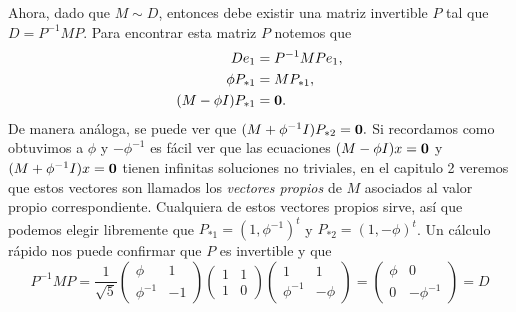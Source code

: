 Ahora, dado que $M \sim D$, entonces debe existir una matriz invertible $P$ tal que $D = P^{-1} M P$. Para encontrar esta matriz $P$ notemos que
\begin{align*}
  De_1 &=  P^{-1} M Pe_1, \\
  \phi P_{*1} &= M P_{*1}, \\
  (M - \phi I)P_{*1} &= \mathbf{0}.
\end{align*}
De manera análoga, se puede ver que $(M + \phi^{-1} I)P_{*2} = \mathbf{0}.$ Si recordamos como obtuvimos a $\phi$ y $-\phi^{-1}$ es fácil ver que las ecuaciones $(M - \phi I)x = \mathbf{0}$ y $(M + \phi^{-1} I)x = \mathbf{0}$ tienen infinitas soluciones no triviales, en el capitulo 2 veremos que estos vectores son llamados los \emph{vectores propios} de $M$ asociados al valor propio correspondiente. Cualquiera de estos vectores propios sirve, así que podemos elegir libremente que $P_{*1} = (1, \phi^{-1})^t$ y $P_{*2} = (1, -\phi)^t$. Un cálculo rápido nos puede confirmar que $P$ es invertible y que
\[
  P^{-1} M P = 
  \frac{1}{\sqrt{5}}\begin{pmatrix} \phi & 1 \\ \phi^{-1} & -1 \end{pmatrix}
  \begin{pmatrix} 1 & 1 \\ 1 & 0 \end{pmatrix}
  \begin{pmatrix} 1 & 1 \\ \phi^{-1} & -\phi \end{pmatrix} =
  \begin{pmatrix} \phi & 0 \\ 0 & -\phi^{-1} \end{pmatrix} = D
\]

